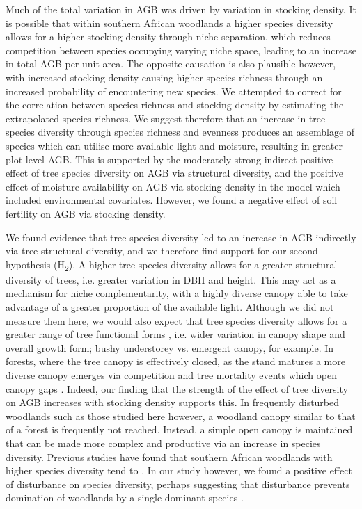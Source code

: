 \documentclass[11pt,a4paper]{article}
\begin{document}
Much of the total variation in AGB was driven by variation in stocking density. It is possible that within southern African woodlands a higher species diversity allows for a higher stocking density through niche separation, which reduces competition between species occupying varying niche space, leading to an increase in total AGB per unit area. The opposite causation is also plausible however, with increased stocking density causing higher species richness through an increased probability of encountering new species. We attempted to correct for the correlation between species richness and stocking density by estimating the extrapolated species richness. We suggest therefore that an increase in tree species diversity through species richness and evenness produces an assemblage of species which can utilise more available light and moisture, resulting in greater plot-level AGB. This is supported by the moderately strong indirect positive effect of tree species diversity on AGB via structural diversity, and the positive effect of moisture availability on AGB via stocking density in the model which included environmental covariates. However, we found a negative effect of soil fertility on AGB via stocking density. 

We found evidence that tree species diversity led to an increase in AGB indirectly via tree structural diversity, and we therefore find support for our second hypothesis (H\textsubscript{2}). A higher tree species diversity allows for a greater structural diversity of trees, i.e. greater variation in DBH and height. This may act as a mechanism for niche complementarity, with a highly diverse canopy able to take advantage of a greater proportion of the available light. Although we did not measure them here, we would also expect that tree species diversity allows for a greater range of tree functional forms \citep{}, i.e. wider variation in canopy shape and overall growth form; bushy understorey vs. emergent canopy, for example. In forests, where the tree canopy is effectively closed, as the stand matures a more diverse canopy emerges via competition and tree mortality events which open canopy gaps \citep{Muscolo2014}. Indeed, our finding that the strength of the effect of tree diversity on AGB increases with stocking density supports this. In frequently disturbed woodlands such as those studied here however, a woodland canopy similar to that of a forest is frequently not reached. Instead, a simple open canopy is maintained that can be made more complex and productive via an increase in species diversity. Previous studies have found that southern African woodlands with higher species diversity tend to  \citep{Chidumayo2013, Mutowo2012}. In our study however, we found a positive effect of disturbance on species diversity, perhaps suggesting that disturbance prevents domination of woodlands by a single dominant species \citep{Chidumayo2013}.
\end{document}
